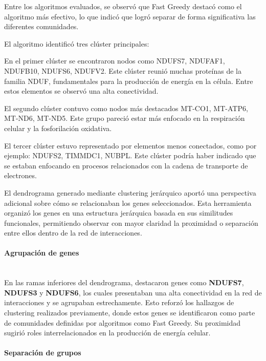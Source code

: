 \vspace{1em}
	

Entre los algoritmos evaluados, se observó que Fast Greedy destacó como el algoritmo más efectivo, lo que indicó que logró separar de forma significativa las diferentes comunidades.

El algoritmo identificó tres clúster principales:

En el primer clúster se encontraron nodos como NDUFS7, NDUFAF1, NDUFB10, NDUFS6, NDUFV2. Este clúster reunió muchas proteínas de la familia NDUF, fundamentales para la producción de energía en la célula. Entre estos elementos se observó una alta conectividad.

El segundo clúster contuvo como nodos más destacados MT-CO1, MT-ATP6, MT-ND6, MT-ND5. Este grupo pareció estar más enfocado en la respiración celular y la fosforilación oxidativa.

El tercer clúster estuvo representado por elementos menos conectados, como por ejemplo: NDUFS2, TIMMDC1, NUBPL. Este clúster podría haber indicado que se estaban enfocando en procesos relacionados con la cadena de transporte de electrones.

El dendrograma generado mediante clustering jerárquico aportó una perspectiva adicional sobre cómo se relacionaban los genes seleccionados. Esta herramienta organizó los genes en una estructura jerárquica basada en sus similitudes funcionales, permitiendo observar con mayor claridad la proximidad o separación entre ellos dentro de la red de interacciones.

\paragraph{Agrupación de genes} \mbox{}\\

En las ramas inferiores del dendrograma, destacaron genes como \textbf{NDUFS7}, \textbf{NDUFS3} y \textbf{NDUFS6}, los cuales presentaban una alta conectividad en la red de interacciones y se agrupaban estrechamente. Esto reforzó los hallazgos de clustering realizados previamente, donde estos genes se identificaron como parte de comunidades definidas por algoritmos como Fast Greedy. Su proximidad sugirió roles interrelacionados en la producción de energía celular.

\paragraph{Separación de grupos} \mbox{}\\

